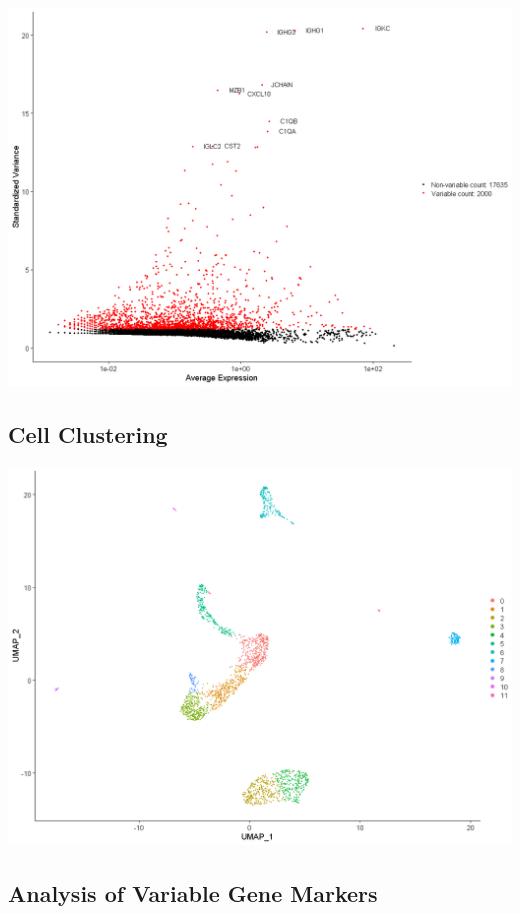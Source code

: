 \documentclass[]{book}
\begin{document}
\includegraphics[width=16.67in]{_book/10X_files/figure-html/differential_genes}

\hypertarget{cell-clustering}{%
\subsection{Cell Clustering}\label{cell-clustering}}

\includegraphics[width=16.67in]{_book/10X_files/figure-html/UMAP}

\hypertarget{analysis-of-variable-gene-markers}{%
\subsection{Analysis of Variable Gene Markers}\label{analysis-of-variable-gene-markers}}
\end{document}
